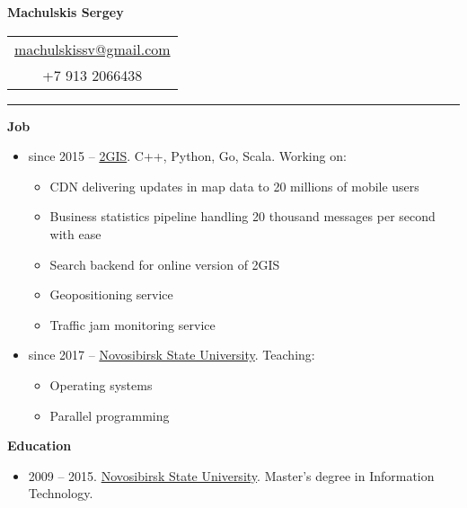 \documentclass[final]{letter}
\begin{document}
\begin{center}

{\fontsize{25}{40}\selectfont\bf{Machulskis Sergey}}
  {\hfill
    \begin{tabular}{c}
        \href{mailto:machulskissv@gmail.com}{machulskissv@gmail.com}\\
        +7 913 2066438\\
     \end{tabular}
  }
\rule{.98\textwidth}{1pt}

\addvspace{.1cm}

\end{center}

{\bf Job}
\begin{itemize}
\item since 2015 -- \href{https://2gis.com}{2GIS}. C++, Python, Go, Scala. Working on:
\begin{itemize}
\item CDN delivering updates in map data to 20 millions of mobile users
\item Business statistics pipeline handling 20 thousand messages per second with ease
\item Search backend for online version of 2GIS
\item Geopositioning service
\item Traffic jam monitoring service
\end{itemize}
\item since 2017 -- \href{http://fit.nsu.ru/}{Novosibirsk State University}. Teaching:
\begin{itemize}
\item Operating systems
\item Parallel programming
\end{itemize}
\end{itemize}

{\bf Education}
\begin{itemize}
\item 2009 -- 2015. \href{https://www.nsu.ru/n/}{Novosibirsk State University}. Master's degree in Information Technology.
\end{itemize}
\end{document}
